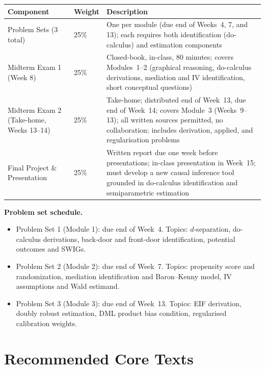\documentclass[12pt]{article}
\begin{document}
\begin{tabularx}{\linewidth}{L{3.4cm} C{1.2cm} X}
  \toprule
  \color{white}\textbf{Component} &
  \color{white}\textbf{Weight} &
  \color{white}\textbf{Description} \\
  \midrule
  Problem Sets (3 total) & 25\% &
    One per module (due end of Weeks~4, 7, and 13);
    each requires both identification (do-calculus) and
    estimation components \\
  Midterm Exam 1 (Week 8) & 25\% &
    Closed-book, in-class, 80 minutes;
    covers Modules~1--2 (graphical reasoning,
    do-calculus derivations, mediation and IV identification,
    short conceptual questions) \\
  Midterm Exam 2 (Take-home, Weeks 13--14) & 25\% &
    Take-home; distributed end of Week~13, due end of Week~14;
    covers Module~3 (Weeks~9--13); all written sources permitted,
    no collaboration; includes derivation, applied, and
    regularisation problems \\
  Final Project \& Presentation & 25\% &
    Written report due one week before presentations;
    in-class presentation in Week~15;
    must develop a new causal inference tool grounded in
    do-calculus identification and semiparametric estimation \\
  \bottomrule
\end{tabularx}
\endgroup

\medskip
\noindent\textbf{Problem set schedule.}
\begin{itemize}
  \item Problem Set 1 (Module 1): due end of Week~4.
    Topics: $d$-separation, do-calculus derivations, back-door and
    front-door identification, potential outcomes and SWIGs.
  \item Problem Set 2 (Module 2): due end of Week~7.
    Topics: propensity score and randomization, mediation identification
    and Baron--Kenny model, IV assumptions and Wald estimand.
  \item Problem Set 3 (Module 3): due end of Week~13.
    Topics: EIF derivation, doubly robust estimation, DML product
    bias condition, regularised calibration weights.
\end{itemize}

\section{Recommended Core Texts}
\end{document}
